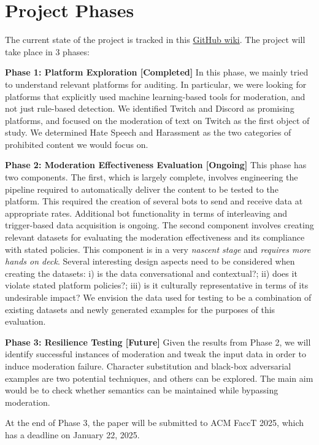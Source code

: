 \documentclass{article}
\begin{document}
\section*{Project Phases}
The current state of the project is tracked in this
\href{https://github.com/weiyinc11/ContentModerationAudit/wiki}{GitHub wiki}.
The project will take place in 3 phases:
 
\noindent \textbf{Phase 1: Platform Exploration [Completed]} In this phase, we
mainly tried to understand relevant platforms for auditing. In particular, we
were looking for platforms that explicitly used machine learning-based tools for
moderation, and not just rule-based detection. We identified Twitch and Discord
as promising platforms, and focused on the moderation of text on Twitch as the
first object of study. We determined Hate Speech and Harassment as the two
categories of prohibited content we would focus on. 

\noindent \textbf{Phase 2: Moderation Effectiveness Evaluation [Ongoing]} This
phase has two components. The first, which is largely complete, involves
engineering the pipeline required to automatically deliver the content to be
tested to the platform. This required the creation of several bots to send and
receive data at appropriate rates. Additional bot functionality in terms of
interleaving and trigger-based data acquisition is ongoing. The second component
involves creating relevant datasets for evaluating the moderation effectiveness
and its compliance with stated policies. This component is in a very
\emph{nascent stage} and \emph{requires more hands on deck}. Several interesting
design aspects need to be considered when creating the datasets: i) is the data
conversational and contextual?; ii) does it violate stated platform policies?;
iii) is it culturally representative in terms of its undesirable impact? We
envision the data used for testing to be a combination of existing datasets and
newly generated examples for the purposes of this evaluation. 

\noindent \textbf{Phase 3: Resilience Testing [Future]} Given the results from
Phase 2, we will identify successful instances of moderation and tweak the input
data in order to induce moderation failure. Character substitution and black-box
adversarial examples are two potential techniques, and others can be explored.
The main aim would be to check whether semantics can be maintained while
bypassing moderation.

At the end of Phase 3, the paper will be submitted to ACM FaccT 2025, which has
a deadline on January 22, 2025. 
\end{document}
